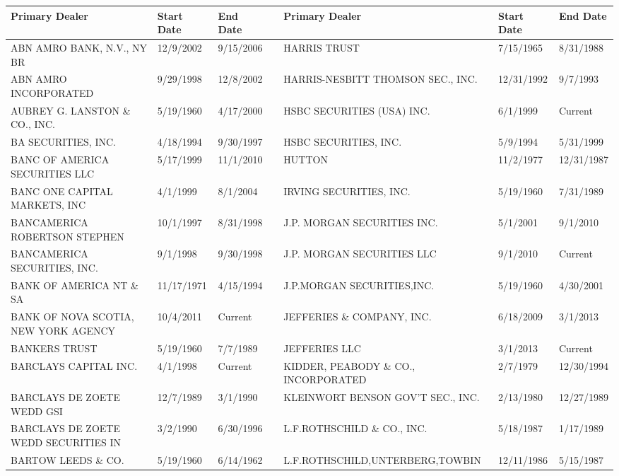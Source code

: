 \documentclass{article}
\begin{document}
\begin{adjustbox}{max width=\textwidth}
\begin{tabular}{lllllll}
\toprule
Primary Dealer & Start Date & End Date &  & Primary Dealer & Start Date & End Date \\
\midrule
ABN AMRO BANK, N.V., NY BR           & 12/9/2002 & 9/15/2006 &  & HARRIS TRUST                        & 7/15/1965 & 8/31/1988 \\
ABN AMRO INCORPORATED                & 9/29/1998 & 12/8/2002 &  & HARRIS-NESBITT THOMSON SEC., INC.   & 12/31/1992 & 9/7/1993 \\
AUBREY G. LANSTON \& CO., INC.       & 5/19/1960 & 4/17/2000 &  & HSBC SECURITIES (USA) INC.           & 6/1/1999 & Current \\
BA SECURITIES, INC.                 & 4/18/1994 & 9/30/1997 &  & HSBC SECURITIES, INC.                & 5/9/1994 & 5/31/1999 \\
BANC OF AMERICA SECURITIES LLC            & 5/17/1999 & 11/1/2010 &  & HUTTON                               & 11/2/1977 & 12/31/1987 \\
BANC ONE CAPITAL MARKETS, INC       & 4/1/1999 & 8/1/2004 &  & IRVING SECURITIES, INC.              & 5/19/1960 & 7/31/1989 \\
BANCAMERICA ROBERTSON STEPHEN       & 10/1/1997 & 8/31/1998 &  & J.P. MORGAN SECURITIES INC.         & 5/1/2001 & 9/1/2010 \\
BANCAMERICA SECURITIES, INC.        & 9/1/1998 & 9/30/1998 &  & J.P. MORGAN SECURITIES LLC & 9/1/2010 & Current \\
BANK OF AMERICA NT \& SA             & 11/17/1971 & 4/15/1994 &  & J.P.MORGAN SECURITIES,INC.           & 5/19/1960 & 4/30/2001 \\
BANK OF NOVA SCOTIA, NEW YORK AGENCY & 10/4/2011 & Current &  & JEFFERIES \& COMPANY, INC. & 6/18/2009 & 3/1/2013 \\
BANKERS TRUST                        & 5/19/1960 & 7/7/1989 &  & JEFFERIES LLC & 3/1/2013 & Current \\
BARCLAYS CAPITAL INC.                & 4/1/1998 & Current &  & KIDDER, PEABODY \& CO., INCORPORATED & 2/7/1979 & 12/30/1994 \\
BARCLAYS DE ZOETE WEDD GSI           & 12/7/1989 & 3/1/1990 &  & KLEINWORT BENSON  GOV'T SEC., INC.   & 2/13/1980 & 12/27/1989 \\
BARCLAYS DE ZOETE WEDD SECURITIES IN & 3/2/1990 & 6/30/1996 &  & L.F.ROTHSCHILD \& CO., INC.      & 5/18/1987 & 1/17/1989 \\
BARTOW LEEDS \& CO.                   & 5/19/1960 & 6/14/1962 &  & L.F.ROTHSCHILD,UNTERBERG,TOWBIN & 12/11/1986 & 5/15/1987 \\

\end{tabular}
\end{adjustbox}
\end{document}
